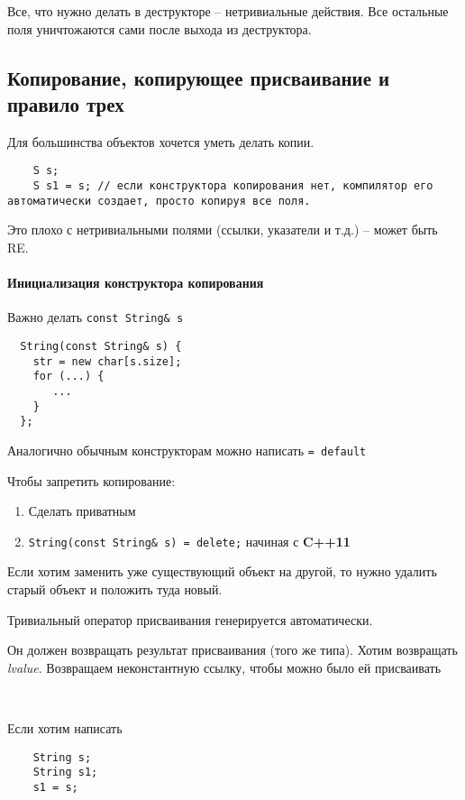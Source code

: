 \documentclass[12pt]{article}
\newcommand{\cppEleven}{\textbf{C++11}}
\begin{document}
Все, что нужно делать в деструкторе -- нетривиальные действия. Все остальные поля уничтожаются сами после выхода из деструктора. 

\subsection{Копирование, копирующее присваивание и правило трех}

Для большинства объектов хочется уметь делать копии. 

\begin{lstlisting}
	S s;
	S s1 = s; // если конструктора копирования нет, компилятор его автоматически создает, просто копируя все поля.  
\end{lstlisting}

Это плохо с нетривиальными полями (ссылки, указатели и т.д.) -- может быть RE. 

\paragraph{Инициализация конструктора копирования} Важно делать \texttt{const String\& s}

\begin{lstlisting}
  String(const String& s) {
    str = new char[s.size];
    for (...) {
       ...
    }	
  };
\end{lstlisting}

Аналогично обычным конструкторам можно написать \texttt{= default} 

Чтобы запретить копирование:

\begin{enumerate}
	\item Сделать приватным
	\item \texttt{String(const String\& s) = delete;} начиная с \cppEleven
\end{enumerate}

Если хотим заменить уже существующий объект на другой, то нужно удалить старый объект и положить туда новый. 

Тривиальный оператор присваивания генерируется автоматически.

Он должен возвращать результат присваивания (того же типа). Хотим возвращать \textit{lvalue}. Возвращаем неконстантную ссылку, чтобы можно было ей присваивать  

\

Если хотим написать 

\begin{lstlisting}
	String s;
	String s1;
	s1 = s;
\end{lstlisting}
\end{document}
